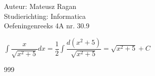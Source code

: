 \documentclass[a4paper]{article}
\begin{document}
\noindent \large Auteur: Mateusz Ragan \\
\noindent \large Studierichting: Informatica\\
\noindent \large Oefeningenreeks 4A nr. 30.9\\

\medskip

\normalsize

$\displaystyle\int \dfrac{x}{\sqrt{x^2+5}}dx = \dfrac{1}{2}\displaystyle\int \dfrac{d(x^2+5)}{\sqrt{x^2+5}} = \sqrt{x^2+5}+C$

\begin{thebibliography}{999}
\end{thebibliography}
\end{document}
